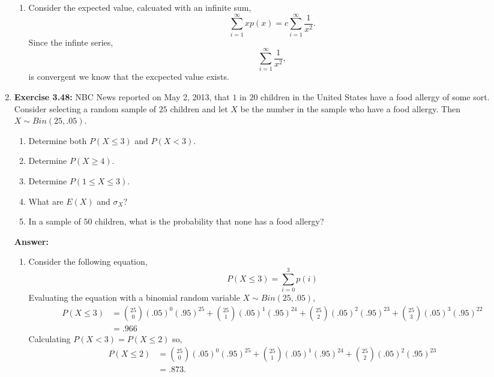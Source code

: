 \documentclass[12pt]{article}
\theoremstyle{homework}
\begin{document}
\begin{enumerate}
\begin{enumerate}
  \item Consider the expected value, calcuated with an infinite sum,
  \begin{equation*}
    \sum_{i = 1}^{\infty}xp(x) = c\sum_{i = 1}^{\infty}\dfrac{1}{x^2}.
  \end{equation*}
  Since the infinte series,
  \begin{equation*}
    \sum_{i = 1}^{\infty}\dfrac{1}{x^2},
  \end{equation*}
  is convergent we know that the excpected value exists. 
\end{enumerate}
\vspace{.5in}







\item\hspace{.5in}\textbf{Exercise 3.48:} NBC News reported on May 2, 2013, that $1$ in $20$ children in the United States have a food allergy of some sort. Consider selecting a random sample of $25$ children and let $X$ be the number in the sample who have a food allergy. Then $X\sim Bin(25, .05)$.
\begin{enumerate}
\item Determine both $P(X \le 3)$ and $P(X < 3)$.
\item Determine $P(X \ge 4)$.
\item Determine $P(1 \le X \le 3)$.
\item What are $E(X)$ and $\sigma_X$?
\item In a sample of $50$ children, what is the probability that none has a food allergy?
\end{enumerate}

\textbf{Answer:} 
\begin{enumerate}
\item Consider the following equation,
\begin{equation*}
  P(X \le 3) = \sum_{i = 0}^{3}p(i)
\end{equation*}
Evaluating the equation with a binomial random variable $X\sim Bin(25, .05)$,
\begin{align*}
  P(X \le 3) &=\binom{25}{0}(.05)^0(.95)^25+\binom{25}{1}(.05)^1(.95)^24+\binom{25}{2}(.05)^2(.95)^23+\binom{25}{3}(.05)^3(.95)^22\\
  &=.966
\end{align*} 
Calculating $P(X < 3) = P(X \le 2)$ so,
\begin{align*}
  P(X \le 2) &= \binom{25}{0}(.05)^0(.95)^25+\binom{25}{1}(.05)^1(.95)^24+\binom{25}{2}(.05)^2(.95)^23\\
  &=.873.
\end{align*}


\end{enumerate}
\end{enumerate}
\end{document}
